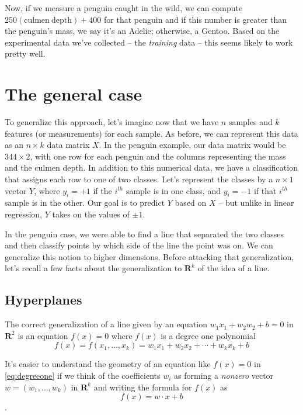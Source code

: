 \documentclass[
  oneside]{scrbook}
\begin{document}
Now, if we measure a penguin caught in the wild, we can compute
\(250(\mathrm{culmen\ depth})+400\) for that penguin and if this number
is greater than the penguin's mass, we say it's an Adelie; otherwise, a
Gentoo. Based on the experimental data we've collected -- the
\emph{training} data -- this seems likely to work pretty well.

\hypertarget{the-general-case}{%
\section{The general case}\label{the-general-case}}

To generalize this approach, let's imagine now that we have \(n\)
samples and \(k\) features (or measurements) for each sample. As before,
we can represent this data as an \(n\times k\) data matrix \(X\). In the
penguin example, our data matrix would be \(344\times 2\), with one row
for each penguin and the columns representing the mass and the culmen
depth. In addition to this numerical data, we have a classification that
assigns each row to one of two classes. Let's represent the classes by a
\(n\times 1\) vector \(Y\), where \(y_{i}=+1\) if the \(i^{th}\) sample
is in one class, and \(y_{i}=-1\) if that \(i^{th}\) sample is in the
other. Our goal is to predict \(Y\) based on \(X\) -- but unlike in
linear regression, \(Y\) takes on the values of \(\pm 1\).

In the penguin case, we were able to find a line that separated the two
classes and then classify points by which side of the line the point was
on. We can generalize this notion to higher dimensions. Before attacking
that generalization, let's recall a few facts about the generalization
to \(\mathbf{R}^{k}\) of the idea of a line.

\hypertarget{hyperplanes}{%
\subsection{Hyperplanes}\label{hyperplanes}}

The correct generalization of a line given by an equation
\(w_1 x_1+ w_2 w_2+b=0\) in \(\mathbf{R}^{2}\) is an equation \(f(x)=0\)
where \(f(x)\) is a degree one polynomial \begin{equation}
f(x) = f(x_1,\ldots, x_k) = w_1 x_1 + w_2 x_2 +\cdots + w_k x_k + b 
\label{eq:degreeone}\end{equation}

It's easier to understand the geometry of an equation like \(f(x)=0\) in
\cref{eq:degreeone} if we think of the coefficients \(w_i\) as forming a
\emph{nonzero} vector \(w = (w_1,\ldots, w_k)\) in \(\mathbf{R}^{k}\)
and writing the formula for \(f(x)\) as \[
f(x) = w\cdot x +b
\].
\end{document}

